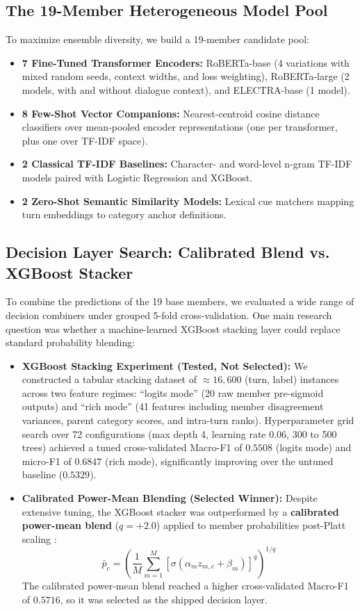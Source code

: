 \subsection{The 19-Member Heterogeneous Model Pool}
To maximize ensemble diversity, we build a 19-member candidate pool:
\begin{itemize}
  \item \textbf{7 Fine-Tuned Transformer Encoders:} RoBERTa-base (4 variations with mixed random seeds, context widths, and loss weighting), RoBERTa-large (2 models, with and without dialogue context), and ELECTRA-base (1 model).
  \item \textbf{8 Few-Shot Vector Companions:} Nearest-centroid cosine distance classifiers over mean-pooled encoder representations (one per transformer, plus one over TF-IDF space).
  \item \textbf{2 Classical TF-IDF Baselines:} Character- and word-level n-gram TF-IDF models paired with Logistic Regression and XGBoost.
  \item \textbf{2 Zero-Shot Semantic Similarity Models:} Lexical cue matchers mapping turn embeddings to category anchor definitions.
\end{itemize}

\subsection{Decision Layer Search: Calibrated Blend vs. XGBoost Stacker}
To combine the predictions of the 19 base members, we evaluated a wide range of decision combiners under grouped 5-fold cross-validation. One main research question was whether a machine-learned XGBoost stacking layer could replace standard probability blending:
\begin{itemize}
  \item \textbf{XGBoost Stacking Experiment (Tested, Not Selected):} We constructed a tabular stacking dataset of $\approx 16{,}600$ (turn, label) instances across two feature regimes: ``logits mode'' (20 raw member pre-sigmoid outputs) and ``rich mode'' (41 features including member disagreement variances, parent category scores, and intra-turn ranks). Hyperparameter grid search over 72 configurations (max depth 4, learning rate 0.06, 300 to 500 trees) achieved a tuned cross-validated Macro-F1 of \textbf{$0.5508$} (logits mode) and micro-F1 of \textbf{$0.6847$} (rich mode), significantly improving over the untuned baseline ($0.5329$).
  \item \textbf{Calibrated Power-Mean Blending (Selected Winner):} Despite extensive tuning, the XGBoost stacker was outperformed by a \textbf{calibrated power-mean blend} ($q=+2.0$) applied to member probabilities post-Platt scaling \cite{platt1999probabilistic}:
    \begin{equation}
      \bar{p}_c = \left( \frac{1}{M} \sum_{m=1}^{M} \left[ \sigma(\alpha_m z_{m,c} + \beta_m) \right]^q \right)^{1/q}
    \end{equation}
    The calibrated power-mean blend reached a higher cross-validated Macro-F1 of \textbf{$0.5716$}, so it was selected as the shipped decision layer.
\end{itemize}

